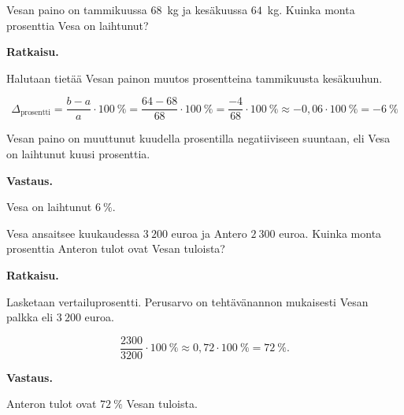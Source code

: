 \begin{esimerkki}
    Vesan paino on tammikuussa $68$~kg ja kesäkuussa $64$~kg. Kuinka monta prosenttia Vesa on laihtunut?
    
    \textbf{Ratkaisu.}
    
    Halutaan tietää Vesan painon muutos prosentteina tammikuusta kesäkuuhun.
    
    \[
        \Delta_{\text{prosentti}}
        = \frac{b-a}{a} \cdot 100~\%
        = \frac{64-68}{68} \cdot 100~\%
        = \frac{-4}{68} \cdot 100~\%
        \approx -0,06 \cdot 100~\%
        = -6~\% 
    \]
    
    Vesan paino on muuttunut kuudella prosentilla negatiiviseen suuntaan,
    eli Vesa on laihtunut kuusi prosenttia.
    
    \textbf{Vastaus.}
    
    Vesa on laihtunut $6~\%$.
\end{esimerkki}


\begin{esimerkki}
    Vesa ansaitsee kuukaudessa ${3~200}$ euroa ja Antero ${2~300}$ euroa.
    Kuinka monta prosenttia Anteron tulot ovat Vesan tuloista? 
    
    \textbf{Ratkaisu.}
    
    Lasketaan vertailuprosentti. Perusarvo on tehtävänannon mukaisesti
    Vesan palkka eli ${3~200}$ euroa.
    
    \[
        \frac{2300}{3200} \cdot 100~\%
        \approx 0,72\cdot 100~\%
        = 72~\%.
    \]
    
    \textbf{Vastaus.}
    
    Anteron tulot ovat $72~\%$ Vesan tuloista.
\end{esimerkki}

